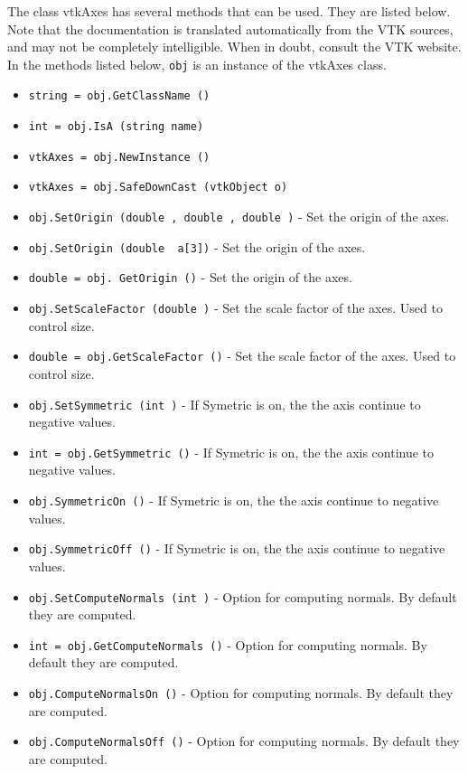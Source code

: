 The class vtkAxes has several methods that can be used.
  They are listed below.
Note that the documentation is translated automatically from the VTK sources,
and may not be completely intelligible.  When in doubt, consult the VTK website.
In the methods listed below, \verb|obj| is an instance of the vtkAxes class.
\begin{itemize}
\item  \verb|string = obj.GetClassName ()|

\item  \verb|int = obj.IsA (string name)|

\item  \verb|vtkAxes = obj.NewInstance ()|

\item  \verb|vtkAxes = obj.SafeDownCast (vtkObject o)|

\item  \verb|obj.SetOrigin (double , double , double )| -  Set the origin of the axes.

\item  \verb|obj.SetOrigin (double  a[3])| -  Set the origin of the axes.

\item  \verb|double = obj. GetOrigin ()| -  Set the origin of the axes.

\item  \verb|obj.SetScaleFactor (double )| -  Set the scale factor of the axes. Used to control size.

\item  \verb|double = obj.GetScaleFactor ()| -  Set the scale factor of the axes. Used to control size.

\item  \verb|obj.SetSymmetric (int )| -  If Symetric is on, the the axis continue to negative values.

\item  \verb|int = obj.GetSymmetric ()| -  If Symetric is on, the the axis continue to negative values.

\item  \verb|obj.SymmetricOn ()| -  If Symetric is on, the the axis continue to negative values.

\item  \verb|obj.SymmetricOff ()| -  If Symetric is on, the the axis continue to negative values.

\item  \verb|obj.SetComputeNormals (int )| -  Option for computing normals.  By default they are computed.

\item  \verb|int = obj.GetComputeNormals ()| -  Option for computing normals.  By default they are computed.

\item  \verb|obj.ComputeNormalsOn ()| -  Option for computing normals.  By default they are computed.

\item  \verb|obj.ComputeNormalsOff ()| -  Option for computing normals.  By default they are computed.

\end{itemize}
